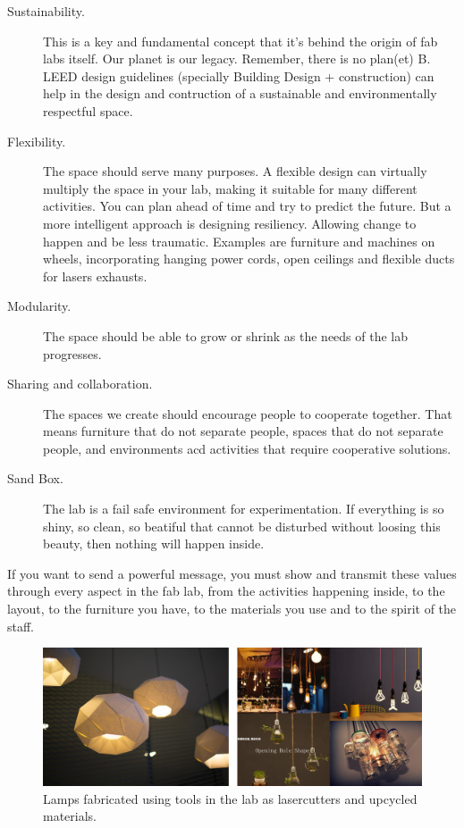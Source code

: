 \documentclass[a4paper,12pt,titlepage]{article}
\begin{document}
\begin{description}
\item[Sustainability.] This is a key and fundamental concept that it's behind the origin of fab labs itself. Our planet is our legacy. Remember, there is no plan(et) B. LEED design guidelines (specially Building Design + construction) can help in the design and contruction of a sustainable and environmentally respectful space.
\item[Flexibility.] The space should serve many purposes. A flexible design can virtually multiply
the space in your lab, making it suitable for many different activities. You can plan ahead of time and try to predict the future. But a more intelligent approach is designing resiliency. Allowing change to happen and be less traumatic. Examples are furniture and machines on wheels, incorporating hanging power cords, open
ceilings and flexible ducts for lasers exhausts.
\item[Modularity.] The space should be able to grow or shrink as the needs of the lab progresses.
\item[Sharing and collaboration.] The spaces we create should encourage people to cooperate together. That means furniture that do not separate people, spaces that do not separate people, and environments acd activities that require cooperative solutions.
\item[Sand Box.] The lab is a fail safe environment for experimentation. If everything is so shiny, so clean, so beatiful that cannot be disturbed without loosing this beauty, then nothing will happen inside.
\end{description}

If you want to send a powerful message, you must show and transmit these values through every
aspect in the fab lab, from the activities happening inside, to the layout, to the furniture you have, to the
materials you use and to the spirit of the staff.

\begin{figure}[h] %
   \centering
   \includegraphics[width=16cm]{files/lamps} 
   \caption{Lamps fabricated using tools in the lab as lasercutters and upcycled materials.}
\end{figure}
\end{document}
